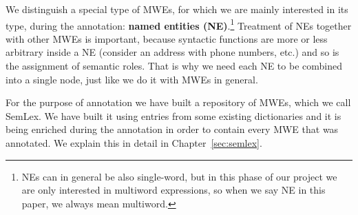 We distinguish a special type of MWEs, for which we are mainly interested in its type, during the annotation: \textbf{named entities (NE)}.\footnote{NEs can in general be also single-word, but in this phase of our project we are only interested in multiword expressions, so when we say NE in this paper, we always mean multiword.} 
%
Treatment of NEs together with other MWEs is important, because syntactic functions
are more or less arbitrary inside a NE (consider an address with phone numbers, etc.) and so is the assignment of semantic roles.
That is why we need each NE to be combined into a single node, just like we do it with MWEs in general. 


For the purpose of annotation we have built a repository of MWEs, which we call SemLex. We have built it using entries from some existing dictionaries and it is being enriched during the annotation in order to contain every MWE that was annotated. We explain this in detail in Chapter~\ref{sec:semlex}. 


